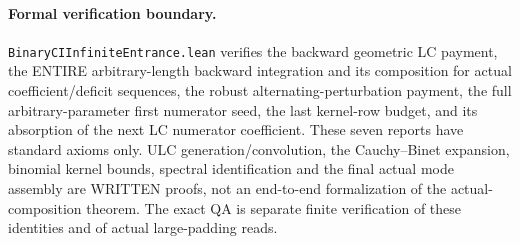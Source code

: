 \paragraph{Formal verification boundary.}
\texttt{BinaryCIInfiniteEntrance.lean} verifies the backward geometric
LC payment, the ENTIRE arbitrary-length backward integration and its
composition for actual coefficient/deficit sequences, the robust
alternating-perturbation payment, the full arbitrary-parameter first
numerator seed, the last kernel-row budget, and its absorption of the
next LC numerator coefficient. These seven reports have standard
axioms only. ULC generation/convolution, the Cauchy--Binet expansion,
binomial kernel bounds, spectral identification and the final actual
mode assembly are WRITTEN proofs, not an end-to-end formalization of
the actual-composition theorem. The exact QA is separate finite
verification of these identities and of actual large-padding reads.
